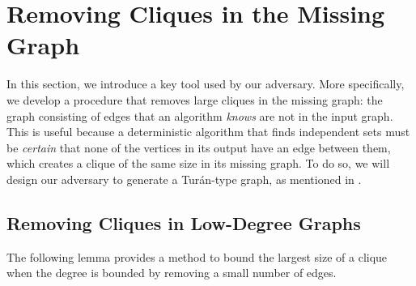 \documentclass[11pt]{article}
\begin{document}
\section{Removing Cliques in the Missing Graph}

\indent In this section, we introduce a key tool used by our adversary. More specifically, we develop a procedure that removes large cliques in the missing graph: the graph consisting of edges that an algorithm \textit{knows} are not in the input graph. This is useful because a deterministic algorithm that finds independent sets must be \textit{certain} that none of the vertices in its output have an edge between them, which creates a clique of the same size in its missing graph. To do so, we will design our adversary to generate a Tur\'an-type graph, as mentioned in .

\subsection{Removing Cliques in Low-Degree Graphs}
The following lemma provides a method to bound the largest size of a clique when the degree is bounded by removing a small number of edges.
\end{document}
